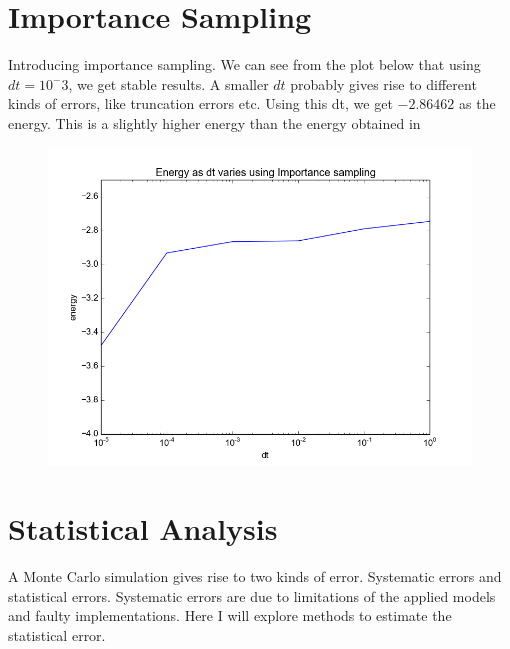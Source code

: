 \documentclass[a4paper, 12pt, titlepage]{article}
\begin{document}
\section*{Importance Sampling}
 Introducing importance sampling. We can see from the plot below that using $dt = 10^-3$, we get stable results. A smaller $dt$ probably gives rise to different kinds of errors, like truncation errors etc. Using this dt, we get $-2.86462$ as the energy. This is a slightly higher energy than the energy obtained in 
 \begin{figure}[H] 
 	\centering
 	\includegraphics[width=\textwidth]{../python_programs/ImportanceSampling_Helium_dt.png}
 \end{figure}

\section*{Statistical Analysis}
 A Monte Carlo simulation gives rise to two kinds of error. Systematic errors and statistical errors. Systematic errors are due to limitations of the applied models and faulty implementations. Here I will explore methods to estimate the statistical error. 
\end{document}
